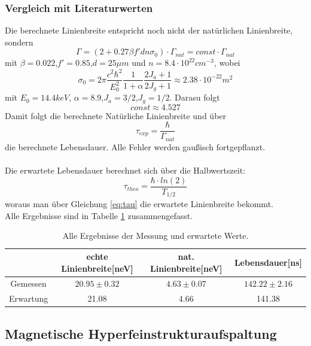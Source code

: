 \documentclass[12pt,a4paper]{article}
\begin{document}
\subsubsection{Vergleich mit Literaturwerten}
Die berechnete Linienbreite entspricht noch nicht der natürlichen Linienbreite, sondern
\begin{equation}
\Gamma = (2+0.27\beta f' d n \sigma_0) \cdot \Gamma_{nat} = const \cdot \Gamma_{nat}
\end{equation}
mit $\beta = 0.022$,$f' = 0.85$,$d = 25\mu m$ und $n=8.4\cdot 10^{22}cm^{-3}$, wobei 
\begin{equation}
\sigma_0 = 2 \pi \dfrac{c^2 \hbar^2}{E_0^2} \dfrac{1}{1+\alpha} \dfrac{2 J_a+1}{2 J_g+1} \approx 2.38\cdot 10^{-22} m^2
\end{equation}
mit $E_0 = 14.4keV$, $\alpha = 8.9$,$J_a = 3/2$,$J_g = 1/2$. Darasu folgt 
\begin{equation}
const \approx 4.527
\end{equation}
Damit folgt die berechnete Natürliche Linienbreite und über
\begin{equation}
\tau_{exp} = \dfrac{\hbar}{\Gamma_{nat}}
\label{eq:tau}
\end{equation}
die berechnete Lebensdauer. Alle Fehler werden gaußisch fortgepflanzt.\\
\\
Die erwartete Lebensdauer berechnet sich über die Halbwertszeit:
\begin{equation}
\tau_{theo} = \dfrac{\hbar\cdot ln(2)}{T_{1/2}}
\end{equation}
woraus man über Gleichung \ref{eq:tau} die erwartete Linienbreite bekommt.\\
Alle Ergebnisse sind in Tabelle \ref{tab:Ein_lit} zusammengefasst.

\begin{table}
\centering
\begin{tabular}{|c|c|c|c|}
\hline 
 & echte Linienbreite[neV] & nat. Linienbreite[neV] & Lebensdauer[ns]\\ 
\hline 
Gemessen & $20.95\pm 0.32$ & $4.63\pm 0.07$ & $142.22\pm2.16$\\ 
\hline 
Erwartung & 21.08 & 4.66 & 141.38\\ 
\hline 
\end{tabular} 
\caption{Alle Ergebnisse der Messung und erwartete Werte.}
\label{tab:Ein_lit}
\end{table}


\subsection{Magnetische Hyperfeinstrukturaufspaltung}
\end{document}
